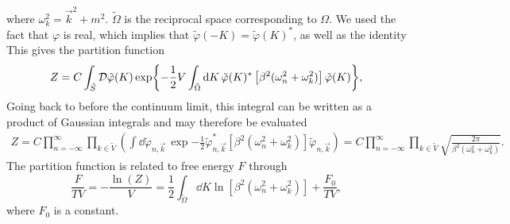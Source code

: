 where $\omega_k^2 = \vec k^2 + m^2$.
$\tilde \Omega$ is the reciprocal space corresponding to $\Omega$.
We used the fact that $\varphi$ is real, which implies that $\tilde \varphi(-K) = \tilde \varphi(K)^*$, as well as the identity 
This gives the partition function 
\begin{equation}
    Z = C \int_{\tilde S} \mathcal D \tilde \varphi(K) 
    \exp{
        -  \frac{1}{2} V \int_{\tilde \Omega} \dd K \, 
        \tilde \varphi(K)^* \left[\beta^2 (\omega_n^2+ \omega_k^2)\right] \tilde \varphi(K)
    },
\end{equation}
Going back to before the continuum limit, this integral can be written as a product of Gaussian integrals and may therefore be evaluated
\begin{align*}
    Z = C \prod_{n=-\infty}^\infty \prod_{k \in \tilde V}
    \left(
        \int \dd \tilde \varphi_{n, \vec k} \,
        \exp{
            - \frac{1}{2} \tilde \varphi_{n, \vec k}^*
            \left[\beta^2 (\omega_n^2+ \omega_k^2)\right] 
            \tilde \varphi_{n, \vec k}
            }
    \right)
    = 
    C \prod_{n=-\infty}^\infty \prod_{k \in \tilde V} 
    \sqrt{\frac{2 \pi}{\beta^2 (\omega_n^2 + \omega_k^2)}}.
\end{align*}
The partition function is related to free energy $F$ through
\begin{equation}
    \label{result free scalar 1}
    \frac{F}{T V}= - \frac{\ln(Z)}{V} = \frac{1}{2} \int_{\tilde \Omega} \dd K \ln[\beta^2(\omega_n^2 + \omega_k^2)] + \frac{F_0}{TV},
\end{equation}
where $F_0$ is a constant.

